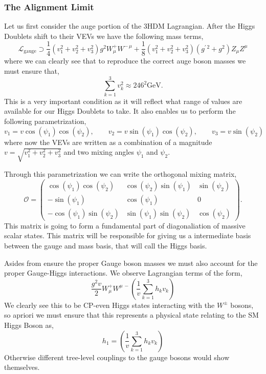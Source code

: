 \subsubsection{The Alignment Limit}

Let us first consider the auge portion of the 3HDM Lagrangian. After the Higgs Doublets shift to their VEVs we have the following mass terms, 
%
\begin{equation}
\mathcal{L}_{\text{gauge}} \supset \frac{1}{4} \left( v_1^2 + v_2^2  + v_3^2 \right) g^2 W^+_\mu W^{-\,\mu} + \frac{1}{8} \left(  v_1^2 + v_2^2  + v_3^2  \right) \left( g^{\prime \, 2} + g^2 \right) Z_\mu Z^\mu  
\end{equation}
where we can clearly see that to reproduce the correct auge boson masses we must ensure that, 
\begin{equation}
\label{eq:VEV_Condition}
\sum_{k=1}^3 v_k^2 \approx 246^2 \text{GeV}. 
\end{equation}
This is a very important condition as it will reflect what range of values are available for our Higgs Doublets to take.
%
It also enables us to perform the following parametrization,
%
\begin{equation}
v_1 = v \cos(\psi_1) \cos(\psi_2), \quad  \quad v_2 = v \sin(\psi_1) \cos(\psi_2), \quad \quad v_3 = v \sin(\psi_2)
\end{equation}
where now the VEVs are written as a combination of a magnitude $v=\sqrt{v_1^2 + v_2^2 + v_3^2 }$ and two mixing angles $\psi_1$ and $\psi_2$. 

Through this parametrization we can write the orthogonal mixing matrix, 
\begin{equation}
\label{eq:3HDM_Orthg}
\mathcal{O} = 
\begin{pmatrix}
\cos(\psi_1) \cos(\psi_2) & \cos(\psi_2) \sin(\psi_1) & \sin(\psi_2) \\ 
- \sin(\psi_1) & \cos(\psi_1) & 0 \\ 
- \cos(\psi_1) \sin(\psi_2) & \sin(\psi_1) \sin(\psi_2) & \cos(\psi_2)
\end{pmatrix}.
\end{equation}
%
This matrix is going to form a fundamental part of  diagonaliation of massive scalar states. 
% 
This matrix will be responsible for giving us a intermediate basis between the gauge and mass basis, that  will call the Higgs basis. 

Asides from ensure the proper Gauge boson masses we must also account for the proper Gauge-Higgs interactions. We observe Lagrangian terms of the form, 
\begin{equation}
\frac{g^2 v}{2} W^+_\mu W^{\mu \, -} \left( \frac{1}{v} \sum_{k=1}^3 h_k v_k \right) 
\end{equation}
We clearly see this to be CP-even Higgs states interacting with the $W^\pm$ bosons, so apriori we must ensure that this represents a physical state relating to the SM Higgs Boson as, 
\begin{equation}
h_1 = \left( \frac{1}{v} \sum_{k=1}^3 h_k v_k \right) 
\end{equation}
Otherwise different tree-level couplings to the gauge bosons would show themselves. 

